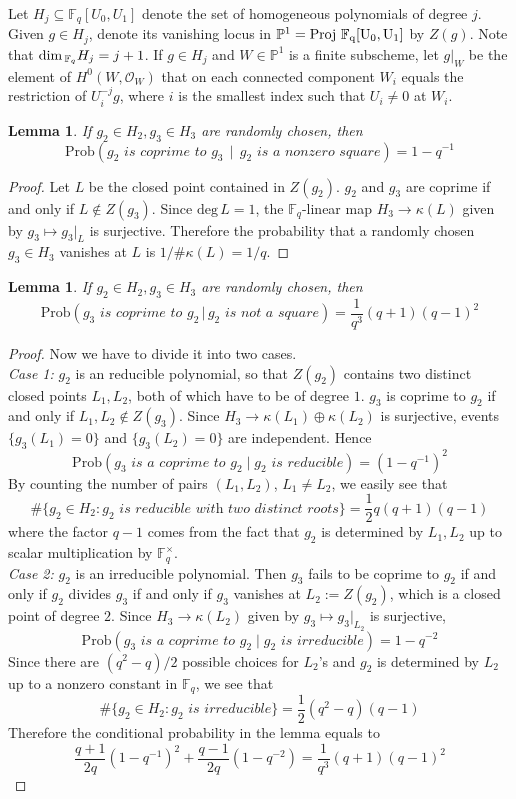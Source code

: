 \documentclass[12pt]{article}
\theoremstyle{plain}
\newtheorem{lemma}[equation]{Lemma}
\theoremstyle{definition}
\newcommand{\IF}{\mathbb{F}}
\newcommand{\IP}{\mathbb{P}}
\newcommand{\sO}{\mathcal{O}}
\renewcommand{\deg}{\mathrm{deg}\,}
\newcommand{\Proj}{\rm Proj\,}
\renewcommand\dim{{\rm dim\,}}
\newcommand{\<}{\langle}
\renewcommand{\>}{\rangle}
\newcommand{\Prob}{\mathrm{Prob}}
\begin{document}
Let $H_j \subseteq \IF_q[U_0, U_1]$ denote the set of homogeneous polynomials of degree $j$. Given $g \in H_j$, denote its vanishing locus in $\IP^1 = \Proj \, \IF_q[U_0, U_1]$ by $Z(g)$. Note that $\dim_{\IF_q} H_j = j + 1$. If $g \in H_j$ and $W \in \IP^1$ is a finite subscheme, let $g|_W$ be the
element of $H^0(W, \sO_W)$ that on each connected component $W_i$ equals the restriction of $U_i^{-j} g$, where $i$ is the smallest index such that $U_i \neq 0$ at $W_i$. 
\begin{lemma} 
\label{square}
If $g_2 \in H_2, g_3 \in H_3$ are randomly chosen, then
$$ \Prob( g_2 \textit{ is coprime to } g_3 \, \mid \, g_2 \textit{ is a nonzero square}) =  1 - q^{-1}$$ 
\end{lemma}
\begin{proof}
Let $L$ be the closed point contained in $Z(g_2)$. $g_2$ and $g_3$ are coprime if and only if $L \not\in Z(g_3)$. Since $\deg L = 1$, the $\IF_q$-linear map $H_3 \to \kappa(L)$ given by $g_3 \mapsto g_3|_{L}$ is surjective. Therefore the probability that a randomly chosen $g_3 \in H_3$ vanishes at $L$ is $1/ \# \kappa(L) = 1/q$. 
\end{proof}

\begin{lemma}
\label{nonsquare} 
If $g_2 \in H_2, g_3 \in H_3$ are randomly chosen, then 
$$ \Prob(g_3 \textit{ is coprime to } g_2 \, | \, g_2 \textit{ is not a square}) = \frac{1}{q^3}(q + 1)(q - 1)^2 $$ 
\end{lemma}
\begin{proof}
Now we have to divide it into two cases. \\
\textit{Case 1:} $g_2$ is an reducible polynomial, so that $Z(g_2)$ contains two distinct closed points $L_1, L_2$, both of which have to be of degree $1$. $g_3$ is coprime to $g_2$ if and only if $L_1, L_2 \not\in Z(g_3)$. Since $H_3 \to \kappa(L_1) \oplus \kappa(L_2)$ is surjective, events $\{ g_3(L_1) = 0\} $ and $\{ g_3(L_2) = 0 \}$ are independent. Hence
$$\Prob(g_3 \textit{ is a coprime to }g_2 \mid g_2 \textit{ is reducible}) = (1 - q^{-1})^2 $$ By counting the number of pairs $(L_1, L_2)$, $L_1 \neq L_2$, we easily see that 
$$ \# \{ g_2 \in H_2 : g_2 \textit{ is reducible with two distinct roots} \} = \frac{1}{2}q(q + 1)(q - 1)$$
where the factor $q - 1$ comes from the fact that $g_2$ is determined by $L_1, L_2$ up to scalar multiplication by $\IF_q^\times$. \\
\textit{Case 2:} $g_2$ is an irreducible polynomial. Then $g_3$ fails to be coprime to $g_2$ if and only if $g_2$ divides $g_3$ if and only if $g_3$ vanishes at $L_2:= Z(g_2)$, which is a closed point of degree $2$. Since $H_3 \to \kappa(L_2)$ given by $g_3 \mapsto g_3|_{L_2}$ is surjective, 
$$\Prob(g_3 \textit{ is a coprime to }g_2 \mid g_2 \textit{ is irreducible}) = 1 - q^{-2} $$
Since there are $(q^2 - q)/2$ possible choices for $L_2$'s and $g_2$ is determined by $L_2$ up to a nonzero constant in $\IF_q$, we see that 
$$ \# \{ g_2 \in H_2 : g_2 \textit{ is irreducible} \} = \frac{1}{2}(q^2 - q)(q - 1)$$ 
Therefore the conditional probability in the lemma equals to 
$$ \frac{q + 1}{2q} (1 - q^{-1})^2 +  \frac{q - 1}{2q} (1 - q^{-2}) =  \frac{1}{q^3}(q + 1)(q - 1)^2 $$
\end{proof}
\end{document}
